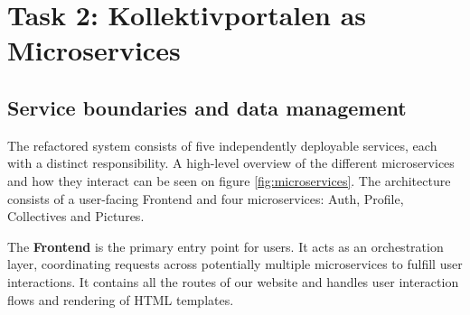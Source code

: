 \section{Task 2: Kollektivportalen as Microservices}

\subsection{Service boundaries and data management} \label{service_boundaries}

The refactored system consists of five independently deployable services, each with a distinct responsibility.
A high-level overview of the different microservices and how they interact can be seen on figure \ref{fig:microservices}.
The architecture consists of a user-facing Frontend and four microservices: Auth, Profile, Collectives and Pictures.

The \textbf{Frontend} is the primary entry point for users. It acts as an orchestration layer, 
coordinating requests across potentially multiple microservices to fulfill user interactions.
It contains all the routes of our website and handles user interaction flows and rendering of HTML templates.

